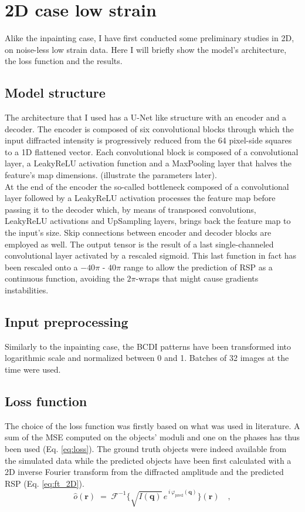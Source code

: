 \section{2D case low strain}\label{chp:2d_nostrain}
Alike the inpainting case, I have first conducted some preliminary studies in 2D, on noise-less low strain data. Here I will 
briefly show the model's architecture, the loss function and the results. 
\subsection{Model structure}
The architecture that I used has a U-Net like structure with an encoder and a decoder. 
The encoder is composed of six convolutional blocks through which the input diffracted intensity is progressively 
reduced from the 64 pixel-side squares to a 1D flattened vector. Each convolutional block is composed of a convolutional 
layer, a LeakyReLU activation function and a MaxPooling layer that halves the feature's map dimensions. (illustrate the 
parameters later). \\
At the end of the encoder the so-called bottleneck composed of a convolutional layer followed by a LeakyReLU activation 
processes the feature map before passing it to the decoder which, by means of transposed convolutions, LeakyReLU activations 
and UpSampling layers, brings back the feature map to the input's size. Skip connections between encoder and decoder blocks 
are employed as well. The output tensor is the result of a last single-channeled convolutional layer activated by a rescaled 
sigmoid. 
This last function in fact has been rescaled onto a $-40\pi$ - $40\pi$ range to allow the prediction of RSP as a continuous 
function, avoiding the $2\pi$-wraps that might cause gradients instabilities. 

\subsection{Input preprocessing} 

Similarly to the inpainting case, the BCDI patterns have been transformed into logarithmic scale and normalized between 
0 and 1. Batches of 32 images at the time were used. 

\subsection{Loss function}
The choice of the loss function was firstly based on what was used in literature. 
A sum of the MSE computed on the objects' moduli and one on the phases has thus been used (Eq. \ref{eq:loss}). The ground truth 
objects were indeed available from the simulated data while the predicted objects have been first calculated with a 2D  
inverse Fourier transform from the diffracted amplitude and the predicted RSP (Eq. \ref{eq:ft_2D}). 
\begin{equation}
    \hat{o}(\mathbf{r})
    \;=\;
    \mathcal{F}^{-1}\!\bigl\{\sqrt{I(\mathbf{q})}\,e^{\,i\,\varphi_{\mathrm{pred}}(\mathbf{q})}\bigr\}(\mathbf{r})
    \quad,
    \label{eq:ft_2D}
\end{equation}

